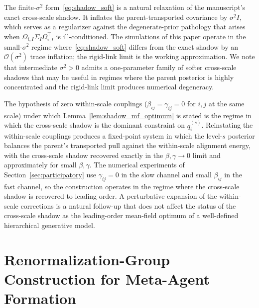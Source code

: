\documentclass[11pt]{article}
\begin{document}
The finite-$\sigma^2$ form~\eqref{eq:shadow_soft} is a natural relaxation of the manuscript's exact cross-scale shadow. It inflates the parent-transported covariance by $\sigma^2 I$, which serves as a regularizer against the degenerate-prior pathology that arises when $\Omega_{i,I}\Sigma_I\Omega_{i,I}^\top$ is ill-conditioned. The simulations of this paper operate in the small-$\sigma^2$ regime where~\eqref{eq:shadow_soft} differs from the exact shadow by an $\mathcal{O}(\sigma^2)$ trace inflation; the rigid-link limit is the working approximation. We note that intermediate $\sigma^2 > 0$ admits a one-parameter family of softer cross-scale shadows that may be useful in regimes where the parent posterior is highly concentrated and the rigid-link limit produces numerical degeneracy.

The hypothesis of zero within-scale couplings ($\beta_{ij} = \gamma_{ij} = 0$ for $i, j$ at the same scale) under which Lemma~\ref{lem:shadow_mf_optimum} is stated is the regime in which the cross-scale shadow is the dominant constraint on $q_i^{(s)}$. Reinstating the within-scale couplings produces a fixed-point system in which the level-$s$ posterior balances the parent's transported pull against the within-scale alignment energy, with the cross-scale shadow recovered exactly in the $\beta, \gamma \to 0$ limit and approximately for small $\beta, \gamma$. The numerical experiments of Section~\ref{sec:participatory} use $\gamma_{ij} = 0$ in the slow channel and small $\beta_{ij}$ in the fast channel, so the construction operates in the regime where the cross-scale shadow is recovered to leading order. A perturbative expansion of the within-scale corrections is a natural follow-up that does not affect the status of the cross-scale shadow as the leading-order mean-field optimum of a well-defined hierarchical generative model.

\section{Renormalization-Group Construction for Meta-Agent Formation}
\label{sec:meta_agent_rg}
\end{document}
